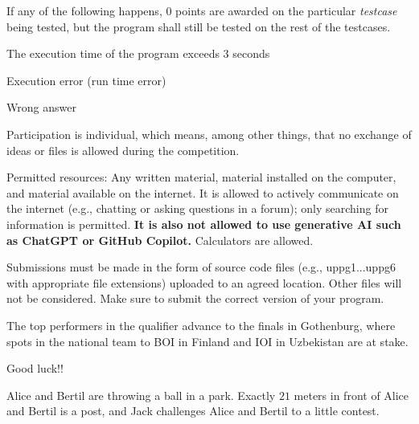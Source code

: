 \begin{lista}
\item If any of the following happens, 0 points are awarded on the particular {\em testcase} being tested,
  but the program shall still be tested on the rest of the testcases.
\begin{lista}
\item The execution time of the program exceeds 3 seconds \vspace{-0.2cm}
\item Execution error (run time error) \vspace{-0.2cm}
\item Wrong answer \vspace{-0.2cm}
\end{lista}

\item Participation is individual, which means, among other things, that no exchange
of ideas or files is allowed during the competition.  
\item Permitted resources: Any written material, material installed on the computer,
and material available on the internet. 
It is  allowed to actively communicate on the internet (e.g., chatting or asking questions in a forum);
only searching for information is permitted.  
{\bf It is also not allowed to use generative AI such as ChatGPT or GitHub Copilot.}  
Calculators are allowed.  
\item Submissions must be made in the form of source code files (e.g., uppg1...uppg6 with appropriate
file extensions) uploaded to an agreed location. Other files will not be considered. Make sure to
submit the correct version of your program.  

The top performers in the qualifier advance to the finals in Gothenburg, where spots in the national team to
BOI in Finland and IOI in Uzbekistan are at stake.

\end{lista}

\begin{center}
\Large Good luck!!
\end{center}
%

\newpage


Alice and Bertil are throwing a ball in a park. Exactly $21$ meters in front of Alice and Bertil is a post, and Jack challenges Alice and Bertil to a little contest.

